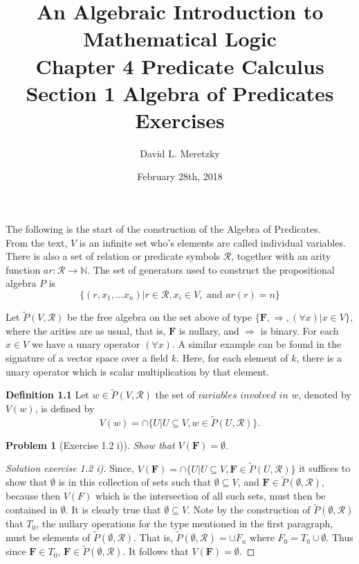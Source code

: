 \documentclass{article}
\title{ \vspace{-10ex} %
An Algebraic Introduction to Mathematical Logic\\
Chapter 4 Predicate Calculus \\
Section 1 Algebra of Predicates \\
Exercises 
}
\author{David L. Meretzky
}
\date{%
February 28th, 2018
}
\theoremstyle{problemstyle}
\newtheorem{problem}{Problem}
\begin{document}
\maketitle




The following is the start of the construction of the Algebra of Predicates.\\

From the text, $V$ is an infinite set who's elements are called individual variables. There is also a set of relation or predicate symbols $\mathscr{R}$, together with an arity function $ar:\mathscr{R}\rightarrow \mathbb{N}$.  The set of generators used to construct the propositional algebra $P$ is $$\{(r,x_1,...x_n)|r \in \mathscr{R}, x_i \in V, \text{ and }ar(r) = n\}$$ 

Let $\widetilde{P}(V,\mathscr{R})$ be the free algebra on the set above of type $\{\textbf{F}, \Rightarrow,(\forall x)|x \in V\}$, where the arities are as usual, that is, $\textbf{F}$ is nullary, and $\Rightarrow$ is binary.  For each $x \in V$ we have a unary operator $(\forall x)$. A similar example can be found in the signature of a vector space over a field $k$. Here, for each element of $k$, there is a unary operator which is scalar multiplication by that element. 

\begin{flushleft}
\textbf{Definition 1.1} Let $w \in \widetilde{P}(V,\mathscr{R})$ the set of $variables$ $involved$ $in$ $w$, denoted by $V(w)$, is defined by $$V(w) = \cap\{U|U \subseteq V, w\in \widetilde{P}(U,\mathscr{R})\}.$$
\end{flushleft}

\begin{problem}[Exercise 1.2 i)] 
Show that $V(\textbf{F}) = \emptyset$.
\end{problem}

\begin{proof}[Solution exercise 1.2 i)]
Since, $V(\textbf{F}) = \cap\{U|U \subseteq V, \textbf{F} \in \widetilde{P}(U,\mathscr{R})\}$ it suffices to show that $\emptyset$ is in this collection of sets such that $\emptyset \subseteq V$, and $\textbf{F} \in \widetilde{P}(\emptyset,\mathscr{R})$, because then $V(F)$ which is the intersection of all such sets, must then be contained in $\emptyset$. It is clearly true that $\emptyset \subseteq V$. Note by the construction of $\widetilde{P}(\emptyset,\mathscr{R})$ that $T_0$, the nullary operations for the type mentioned in the first paragraph, must be elements of $\widetilde{P}(\emptyset,\mathscr{R})$. That is, $\widetilde{P}(\emptyset,\mathscr{R}) = \cup F_n$ where $F_0 = T_0 \cup \emptyset$. Thus since $\textbf{F} \in T_0$, $\textbf{F} \in \widetilde{P}(\emptyset,\mathscr{R})$. It follows that $V(\textbf{F}) = \emptyset$.
\end{proof}
\end{document}
